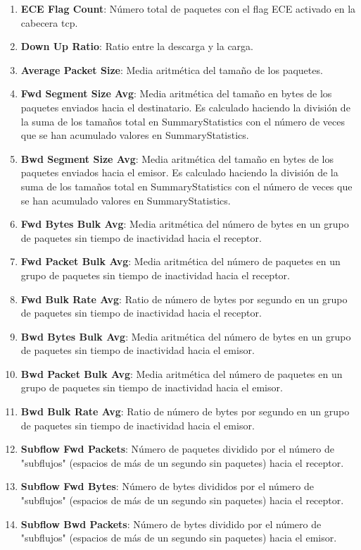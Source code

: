 \begin{enumerate}
    \item \textbf{ECE Flag Count}: Número total de paquetes con el flag ECE activado en la cabecera \acrshort{tcp}.
    \item \textbf{Down Up Ratio}: Ratio entre la descarga y la carga.
    \item \textbf{Average Packet Size}: Media aritmética del tamaño de los paquetes.
    \item \textbf{Fwd Segment Size Avg}: Media aritmética del tamaño en bytes de los paquetes enviados hacia el destinatario. Es calculado haciendo la división de la suma de los tamaños total en SummaryStatistics con el número de veces que se han acumulado valores en SummaryStatistics.
    \item \textbf{Bwd Segment Size Avg}: Media aritmética del tamaño en bytes de los paquetes enviados hacia el emisor. Es calculado haciendo la división de la suma de los tamaños total en SummaryStatistics con el número de veces que se han acumulado valores en SummaryStatistics.
    \item \textbf{Fwd Bytes Bulk Avg}: Media aritmética del número de bytes en un grupo de paquetes sin tiempo de inactividad hacia el receptor.
    \item \textbf{Fwd Packet Bulk Avg}: Media aritmética del número de paquetes en un grupo de paquetes sin tiempo de inactividad hacia el receptor.
    \item \textbf{Fwd Bulk Rate Avg}: Ratio de número de bytes por segundo en un grupo de paquetes sin tiempo de inactividad hacia el receptor.
    \item \textbf{Bwd Bytes Bulk Avg}: Media aritmética del número de bytes en un grupo de paquetes sin tiempo de inactividad hacia el emisor.
    \item \textbf{Bwd Packet Bulk Avg}: Media aritmética del número de paquetes en un grupo de paquetes sin tiempo de inactividad hacia el emisor.
    \item \textbf{Bwd Bulk Rate Avg}: Ratio de número de bytes por segundo en un grupo de paquetes sin tiempo de inactividad hacia el emisor.
    \item \textbf{Subflow Fwd Packets}: Número de paquetes dividido por el número de "subflujos" (espacios de más de un segundo sin paquetes) hacia el receptor.
    \item \textbf{Subflow Fwd Bytes}: Número de bytes divididos por el número de "subflujos" (espacios de más de un segundo sin paquetes) hacia el receptor.
    \item \textbf{Subflow Bwd Packets}: Número de bytes dividido por el número de "subflujos" (espacios de más de un segundo sin paquetes) hacia el emisor.

\end{enumerate}

